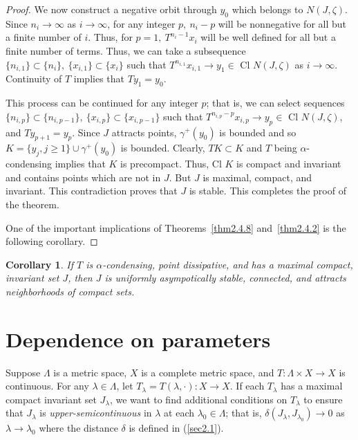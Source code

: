 \documentclass{surv-l}
\theoremstyle{plain}
\newtheorem{corollary}[theorem]{Corollary}
\theoremstyle{definition}
\numberwithin{equation}{section}
\numberwithin{figure}{chapter}
\begin{document}
\begin{proof}
We now construct a negative orbit through $y_{0}$ which belongs to $N(J, \zeta)$. Since $n_{i}\rightarrow\infty$ as $i\rightarrow\infty$, for any integer $p,\ n_{i}-p$ will be nonnegative for all but a finite number of $i$. Thus, for $p=1,\ T^{n_{i}-1}x_{i}$ will be well defined for all but a finite number of terms. Thus, we can take a subsequence $\{n_{i,1}\}\subset\{n_{i}\},\ \{x_{i,1}\}\subset\{x_{i}\}$ such that $T^{n_{i,1}}x_{i,1}\rightarrow y_{1}\in$ Cl $N(J, \zeta)$ as $i\rightarrow\infty$. Continuity of $T$ implies that $Ty_{1}=y_{0}$.

This process can be continued for any integer $p$; that is, we can select sequences $\{n_{i,p}\}\subset\{n_{i,p-1}\},\ \{x_{i,p}\}\subset\{x_{i,p-1}\}$ such that $T^{n_{i,p}-p}x_{i,p}\rightarrow y_{p}\in$ Cl $N(J, \zeta)$, and $Ty_{p+1}=y_{p}$. Since $J$ attracts points, $\gamma^{+}(y_{0})$ is bounded and so $K=\{y_{j}, j\geq 1\}\cup\gamma^{+}(y_{0})$ is bounded. Clearly, $TK\subset K$ and $T$ being $\alpha$-condensing implies that $K$ is precompact. Thus, Cl $K$ is compact and invariant and contains points which are not in $J$. But $J$ is maximal, compact, and invariant. This contradiction proves that $J$ is stable. This completes the proof of the theorem.

One of the important implications of Theorems~\ref{thm2.4.8} and~\ref{thm2.4.2} is the following corollary.
\end{proof}

\begin{corollary}\label{cor2.4.9} If $T$ is $\alpha$-condensing, point dissipative, and has a maximal compact, invariant set $J$, then $J$ is uniformly asympotically stable, connected, and attracts neighborhoods of compact sets.
\end{corollary}
\setcounter{section}{4}
\section{Dependence on parameters}\label{sec2.5}

Suppose $\Lambda$ is a metric space, $X$ is a complete metric space, and $T\!:\Lambda\times X\rightarrow X$ is continuous. For any $\lambda\in\Lambda$, let $T_{\lambda}=T(\lambda, \cdot)\!:X\rightarrow X$. If each $T_{\lambda}$ has a maximal compact invariant set $J_{\lambda}$, we want to find additional conditions on $T_{\lambda}$ to ensure that $J_{\lambda}$ is \emph{upper-semicontinuous} in $\lambda$ at each $\lambda_{0}\in\Lambda$; that is, $\delta(J_{\lambda}, J_{\lambda_{0}})\rightarrow 0$ as $\lambda\rightarrow\lambda_{0}$ where the distance $\delta$ is defined in (\ref{sec2.1}).
\end{document}

